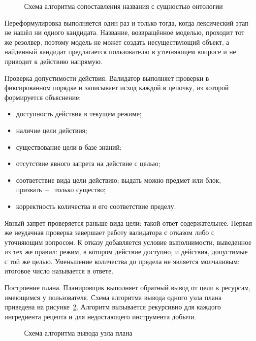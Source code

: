 \begin{figure}[!htb]
  \centering
  
  \caption{Схема алгоритма сопоставления названия с сущностью онтологии}
  \label{fig:resolver}
\end{figure}

Переформулировка выполняется один раз и только тогда, когда лексический этап не нашёл
ни одного кандидата. Название, возвращённое моделью, проходит тот же резолвер, поэтому
модель не может создать несуществующий объект, а найденный кандидат предлагается
пользователю в уточняющем вопросе и не приводит к действию напрямую.

Проверка допустимости действия. Валидатор выполняет проверки в фиксированном порядке
и записывает исход каждой в цепочку, из которой формируется объяснение:

\begin{itemize}
  \item доступность действия в текущем режиме;
  \item наличие цели действия;
  \item существование цели в базе знаний;
  \item отсутствие явного запрета на действие с целью;
  \item соответствие вида цели действию: выдать можно предмет или блок, призвать~--~
        только существо;
  \item корректность количества и его соответствие пределу.
\end{itemize}

Явный запрет проверяется раньше вида цели: такой ответ содержательнее. Первая же
неудачная проверка завершает работу валидатора с отказом либо с уточняющим вопросом.
К отказу добавляется условие выполнимости, выведенное из тех же правил: режим, в котором
действие доступно, и действия, допустимые с той же целью. Уменьшение количества до
предела не является молчаливым: итоговое число называется в ответе.

Построение плана. Планировщик выполняет обратный вывод от цели к ресурсам, имеющимся у
пользователя\cite{Fikes1971,Ghallab2004}. Схема алгоритма вывода одного узла плана
приведена на рисунке~\ref{fig:planner}. Алгоритм вызывается рекурсивно для каждого
ингредиента рецепта и для недостающего инструмента добычи.

\begin{figure}[!htb]
  \centering
  
  \caption{Схема алгоритма вывода узла плана}
  \label{fig:planner}
\end{figure}

